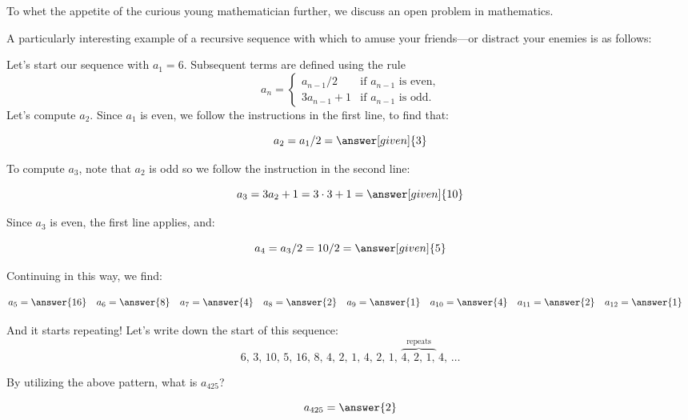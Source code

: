 \documentclass{ximera}
\author{Jim Talamo and Bart Snapp}
\begin{document}
\begin{exercise}

To whet the appetite of the curious young mathematician further, we discuss an open problem in mathematics.

A particularly interesting example of a recursive sequence with which to amuse your friends---or distract
your enemies is as follows:

Let's start our sequence with $a_1 = 6$.  Subsequent terms are
  defined using the rule
  \[
  a_n =
  \begin{cases}
    a_{n-1} / 2 &\text{if $a_{n-1}$ is even,} \\
    3a_{n-1} + 1 &\text{if $a_{n-1}$ is odd.}
  \end{cases}
  \]
  Let's compute $a_2$.  Since $a_1$ is even, we follow the
  instructions in the first line, to find that:
  
  \[a_2 = a_1/2 = \answer[given]{3}\]
  
  \begin{exercise}
  To compute $a_3$, note that $a_2$ is odd so we
  follow the instruction in the second line:
  
  \[a_3 = 3 a_2 + 1 = 3 \cdot 3 + 1 = \answer[given]{10} \]
  
  \begin{exercise}
  Since $a_3$ is even, the first line applies, and:
  
  \[ a_4 = a_3 / 2 = 10 / 2 = \answer[given]{5} \]
  
  \begin{exercise}
Continuing in this way, we find:

\begin{align*}
a_5 & = \answer{16} & a_6 & = \answer{8} & a_7 & = \answer{4} & a_8 & = \answer{2} & a_9 & = \answer{1} & a_{10} & = \answer{4} & a_{11} & = \answer{2} & a_{12} & = \answer{1}
\end{align*}

\begin{exercise}
And it starts repeating!  Let's write down the start of this sequence:
  \[
  6,\, %
  3,\, %
  10,\,  %
  5,\,  %
  16,\,  %
  8,\,  %
  4,\,  %
  2,\,  %
  1,\,  %
  4,\, %
  2,\, %
  1,\, %
  \overbrace{4,\, %
    2,\, %
    1,}^{\text{repeats}}\, %
  4,\, %
  \ldots
  \]
  
  \begin{exercise}
  By utilizing the above pattern, what is $a_{425}$?  
  
  \[
  a_{425} = \answer{2}
  \]
    

\end{exercise}
\end{exercise}
\end{exercise}
\end{exercise}
\end{exercise}
\end{exercise}
\end{document}
